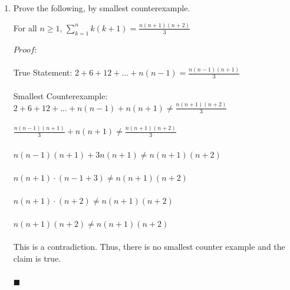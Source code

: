 \documentclass[12pt]{article}
\begin{document}
\begin{enumerate}
\item Prove the following, by smallest counterexample. 

For all $n\geqslant 1$, $\sum\limits_{k=1}^n k(k{+}1) = \frac{n(n{+}1)(n{+}2)}{3}$


{\color{blue}
$Proof:$\\\\
True Statement: $2+6+12+...+n(n-1) = \frac{n(n-1)(n+1)}{3}$\\\\
Smallest Counterexample: $2+6+12+...+n(n-1)+n(n+1) \neq \frac{n(n+1)(n+2)}{3}$\\\\
$\frac{n(n-1)(n+1)}{3}+n(n+1) \neq \frac{n(n+1)(n+2)}{3}$\\\\
$n(n-1)(n+1) + 3n(n+1) \neq n(n+1)(n+2)$\\\\
$n(n+1) \cdot (n-1+3) \neq n(n+1)(n+2)$\\\\
$n(n+1) \cdot (n+2) \neq n(n+1)(n+2)$\\\\
$n(n+1)(n+2) \neq n(n+1)(n+2)$\\\\
This is a contradiction. Thus, there is no smallest counter example and the claim is true.\\\\
$\blacksquare$
}   


{\color{blue}


}












\end{enumerate} 
\end{document}
